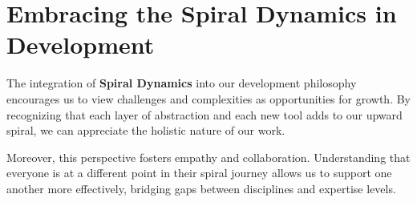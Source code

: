 \documentclass[../../main.tex]{subfiles}
\begin{document}
    \section{Embracing the Spiral Dynamics in Development}

    The integration of \textbf{Spiral Dynamics} into our development philosophy encourages us to view challenges and complexities as opportunities for growth. By recognizing that each layer of abstraction and each new tool adds to our upward spiral, we can appreciate the holistic nature of our work.

    Moreover, this perspective fosters empathy and collaboration. Understanding that everyone is at a different point in their spiral journey allows us to support one another more effectively, bridging gaps between disciplines and expertise levels.
\end{document}
